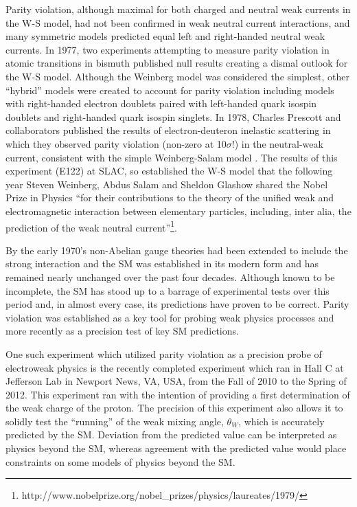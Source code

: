 Parity violation, although maximal for both charged and neutral weak currents in the W-S model, had not been confirmed in weak neutral current interactions, and many symmetric models predicted equal left and right-handed neutral weak currents\cite{Staley}. In 1977, two experiments attempting to measure parity violation in atomic transitions in bismuth published null results creating a dismal outlook for the W-S model\cite{Lewis}\cite{Baird}. Although the Weinberg model was considered the simplest, other ``hybrid'' models were created to account for parity violation including models with right-handed electron doublets paired with left-handed quark isospin doublets and right-handed quark isospin singlets. In 1978, Charles Prescott and collaborators published the results of electron-deuteron inelastic scattering in which they observed parity violation (non-zero at 10$\sigma$!) in the neutral-weak current, consistent with the simple Weinberg-Salam model \cite{Prescott}. The results of this experiment (E122) at SLAC, so established the W-S model that the following year Steven Weinberg, Abdus Salam and Sheldon Glashow shared the Nobel Prize in Physics ``for their contributions to the theory of the unified weak and electromagnetic interaction between elementary particles, including, inter alia, the prediction of the weak neutral current''\footnote{http://www.nobelprize.org/nobel\_prizes/physics/laureates/1979/}.

By the early 1970's non-Abelian gauge theories had been extended to include the strong interaction and the SM was established in its modern form and has remained nearly unchanged over the past four decades. Although known to be incomplete, the SM has stood up to a barrage of experimental tests over this period and, in almost every case, its predictions have proven to be correct. Parity violation was established as a key tool for probing weak physics processes and more recently as a precision test of key SM predictions.

One such experiment which utilized parity violation as a precision probe of electroweak physics is the recently completed \Qs experiment which ran in Hall C at Jefferson Lab in Newport News, VA, USA, from the Fall of 2010 to the Spring of 2012. This experiment ran with the intention of providing a first determination of the weak charge of the proton. The precision of this experiment also allows it to solidly test the ``running'' of the weak mixing angle, $\theta_W$, which is accurately predicted by the SM. Deviation from the predicted value can be interpreted as physics beyond the SM, whereas agreement with the predicted value would place constraints on some models of physics beyond the SM. 

